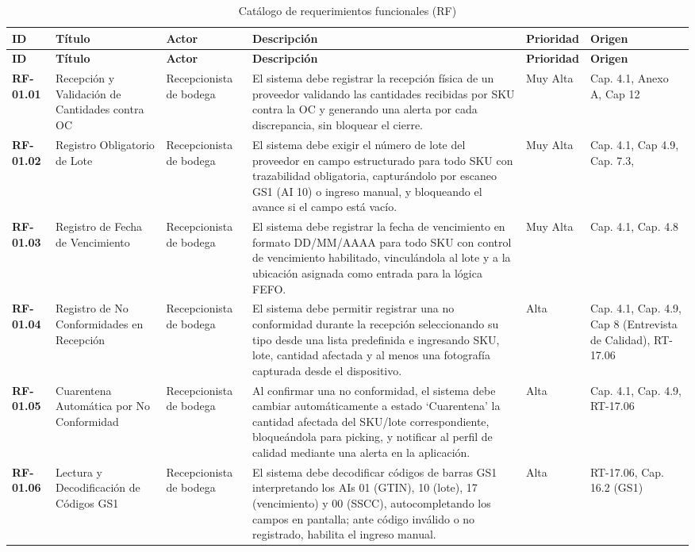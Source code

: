 ﻿\begin{longtable}{p{1.7cm} p{2.3cm} p{1.9cm} p{5.0cm} p{1.1cm} p{1.9cm}}
\caption{Cat\'alogo de requerimientos funcionales (RF)}\label{tab:rf}\\
\toprule
\textbf{ID} & \textbf{T\'itulo} & \textbf{Actor} & \textbf{Descripci\'on} & \textbf{Prioridad} & \textbf{Origen} \\
\midrule
\endfirsthead
\toprule
\textbf{ID} & \textbf{T\'itulo} & \textbf{Actor} & \textbf{Descripci\'on} & \textbf{Prioridad} & \textbf{Origen} \\
\midrule
\endhead
\bottomrule
\endlastfoot
\textbf{RF-01.01} & Recepción y Validación de Cantidades contra OC & Recepcionista de bodega & El sistema debe registrar la recepción física de un proveedor validando las cantidades recibidas por SKU contra la OC y generando una alerta por cada discrepancia, sin bloquear el cierre. & Muy Alta & Cap. 4.1, Anexo A, Cap 12 \\
\textbf{RF-01.02} & Registro Obligatorio de Lote & Recepcionista de bodega & El sistema debe exigir el número de lote del proveedor en campo estructurado para todo SKU con trazabilidad obligatoria, capturándolo por escaneo GS1 (AI 10) o ingreso manual, y bloqueando el avance si el campo está vacío. & Muy Alta & Cap. 4.1, Cap 4.9, Cap. 7.3, \\
\textbf{RF-01.03} & Registro de Fecha de Vencimiento & Recepcionista de bodega & El sistema debe registrar la fecha de vencimiento en formato DD/MM/AAAA para todo SKU con control de vencimiento habilitado, vinculándola al lote y a la ubicación asignada como entrada para la lógica FEFO. & Muy Alta & Cap. 4.1, Cap. 4.8 \\
\textbf{RF-01.04} & Registro de No Conformidades en Recepción & Recepcionista de bodega & El sistema debe permitir registrar una no conformidad durante la recepción seleccionando su tipo desde una lista predefinida e ingresando SKU, lote, cantidad afectada y al menos una fotografía capturada desde el dispositivo. & Alta & Cap. 4.1, Cap. 4.9, Cap 8 (Entrevista de Calidad), RT-17.06 \\
\textbf{RF-01.05} & Cuarentena Automática por No Conformidad & Recepcionista de bodega & Al confirmar una no conformidad, el sistema debe cambiar automáticamente a estado ‘Cuarentena’ la cantidad afectada del SKU/lote correspondiente, bloqueándola para picking, y notificar al perfil de calidad mediante una alerta en la aplicación. & Alta & Cap. 4.1, Cap. 4.9, RT-17.06 \\
\textbf{RF-01.06} & Lectura y Decodificación de Códigos GS1 & Recepcionista de bodega & El sistema debe decodificar códigos de barras GS1 interpretando los AIs 01 (GTIN), 10 (lote), 17 (vencimiento) y 00 (SSCC), autocompletando los campos en pantalla; ante código inválido o no registrado, habilita el ingreso manual. & Alta & RT-17.06, Cap. 16.2 (GS1) \\

\end{longtable}
